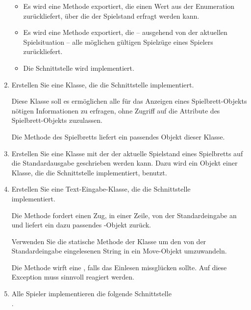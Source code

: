 \begin{enumerate}
\begin{itemize}
\item Es wird eine Methode exportiert, die einen Wert aus der Enumeration\\  zurückliefert, über die der Spielstand erfragt werden kann.

\item Es wird eine Methode exportiert, die -- ausgehend von der aktuellen Spielsituation -- alle möglichen gültigen Spielzüge eines Spielers zurückliefert.
\item Die Schnittstelle  wird implementiert.
\end{itemize}

\item Erstellen Sie eine Klasse, die die Schnittstelle  implementiert.

Diese Klasse soll es ermöglichen alle für das Anzeigen eines Spielbrett-Objekts nötigen Informationen zu erfragen, ohne Zugriff auf die Attribute des Spielbrett-Objekts zuzulassen.

Die Methode  des Spielbretts liefert ein passendes Objekt dieser Klasse.

\item Erstellen Sie eine Klasse mit der der aktuelle Spielstand eines Spielbretts auf die Standardausgabe geschrieben werden kann. Dazu wird ein Objekt einer Klasse, die die Schnittstelle  implementiert, benutzt.

\item Erstellen Sie eine Text-Eingabe-Klasse, die die Schnittstelle \\  implementiert.

Die Methode  fordert einen Zug, in einer Zeile, von der Standardeingabe an und liefert ein dazu passendes -Objekt zurück.

Verwenden Sie die statische Methode  der Klasse  um den von der Standardeingabe eingelesenen String in ein Move-Objekt umzuwandeln.

Die Methode  wirft eine , falls das Einlesen missglücken sollte. Auf diese Exception muss sinnvoll reagiert werden.

\item Alle Spieler implementieren die folgende Schnittstelle \\ .


\end{enumerate}
